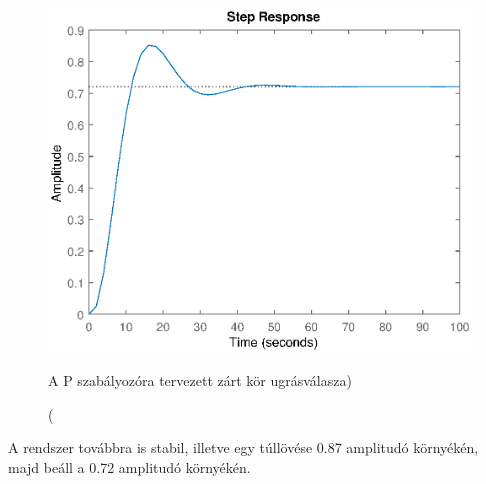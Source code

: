 \documentclass[12pt]{article}
\begin{document}
\begin{figure}[H]
\centering
\includegraphics[scale=.70]{WPLANTPCLMR}
\caption(A P szabályozóra tervezett zárt kör ugrásválasza)
\end{figure}
A rendszer továbbra is stabil, illetve egy túllövése 0.87 amplitudó környékén, majd beáll a 0.72 amplitudó környékén.
\end{document}
